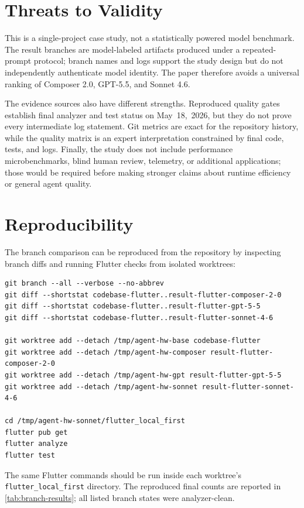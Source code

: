 \documentclass[11pt]{article}
\newcommand{\AppPath}{\texttt{flutter\_local\_first}}
\newcommand{\VerificationDate}{May~18,~2026}
\begin{document}
\section{Threats to Validity}
\label{sec:threats}

This is a single-project case study, not a statistically powered model benchmark. The result branches are model-labeled artifacts produced under a repeated-prompt protocol; branch names and logs support the study design but do not independently authenticate model identity. The paper therefore avoids a universal ranking of Composer 2.0, GPT-5.5, and Sonnet 4.6.

The evidence sources also have different strengths. Reproduced quality gates establish final analyzer and test status on \VerificationDate{}, but they do not prove every intermediate log statement. Git metrics are exact for the repository history, while the quality matrix is an expert interpretation constrained by final code, tests, and logs. Finally, the study does not include performance microbenchmarks, blind human review, telemetry, or additional applications; those would be required before making stronger claims about runtime efficiency or general agent quality.

\section{Reproducibility}
\label{sec:reproducibility}

The branch comparison can be reproduced from the repository by inspecting branch diffs and running Flutter checks from isolated worktrees:

\begin{verbatim}
git branch --all --verbose --no-abbrev
git diff --shortstat codebase-flutter..result-flutter-composer-2-0
git diff --shortstat codebase-flutter..result-flutter-gpt-5-5
git diff --shortstat codebase-flutter..result-flutter-sonnet-4-6

git worktree add --detach /tmp/agent-hw-base codebase-flutter
git worktree add --detach /tmp/agent-hw-composer result-flutter-composer-2-0
git worktree add --detach /tmp/agent-hw-gpt result-flutter-gpt-5-5
git worktree add --detach /tmp/agent-hw-sonnet result-flutter-sonnet-4-6

cd /tmp/agent-hw-sonnet/flutter_local_first
flutter pub get
flutter analyze
flutter test
\end{verbatim}

The same Flutter commands should be run inside each worktree's \AppPath{} directory. The reproduced final counts are reported in \cref{tab:branch-results}; all listed branch states were analyzer-clean.
\end{document}
